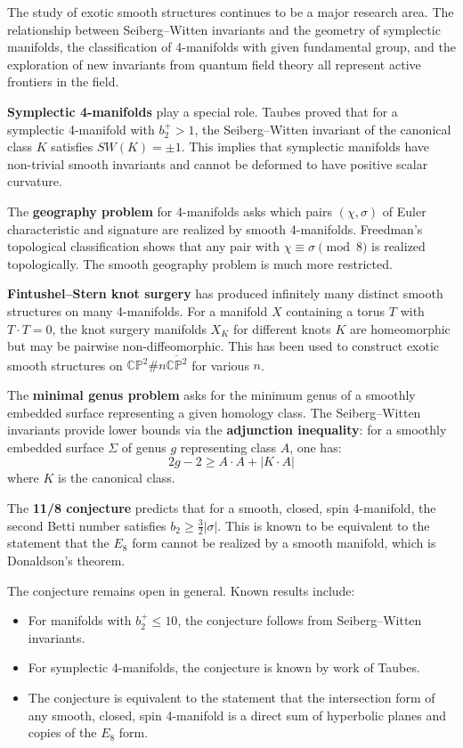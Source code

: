 The study of exotic smooth structures continues to be a major research area. The relationship between Seiberg--Witten invariants and the geometry of symplectic manifolds, the classification of 4-manifolds with given fundamental group, and the exploration of new invariants from quantum field theory all represent active frontiers in the field.

\textbf{Symplectic 4-manifolds} play a special role. Taubes proved that for a symplectic 4-manifold with $b_2^+ > 1$, the Seiberg--Witten invariant of the canonical class $K$ satisfies $SW(K) = \pm 1$. This implies that symplectic manifolds have non-trivial smooth invariants and cannot be deformed to have positive scalar curvature.

The \textbf{geography problem} for 4-manifolds asks which pairs $(\chi, \sigma)$ of Euler characteristic and signature are realized by smooth 4-manifolds. Freedman's topological classification shows that any pair with $\chi \equiv \sigma \pmod{8}$ is realized topologically. The smooth geography problem is much more restricted.

\textbf{Fintushel--Stern knot surgery} has produced infinitely many distinct smooth structures on many 4-manifolds. For a manifold $X$ containing a torus $T$ with $T \cdot T = 0$, the knot surgery manifolds $X_K$ for different knots $K$ are homeomorphic but may be pairwise non-diffeomorphic. This has been used to construct exotic smooth structures on $\mathbb{CP}^2 \# n\overline{\mathbb{CP}^2}$ for various $n$.

The \textbf{minimal genus problem} asks for the minimum genus of a smoothly embedded surface representing a given homology class. The Seiberg--Witten invariants provide lower bounds via the \textbf{adjunction inequality}: for a smoothly embedded surface $\Sigma$ of genus $g$ representing class $A$, one has:
\[
2g - 2 \geq A \cdot A + |K \cdot A|
\]
where $K$ is the canonical class.

The \textbf{11/8 conjecture} predicts that for a smooth, closed, spin 4-manifold, the second Betti number satisfies $b_2 \geq \frac{3}{2}|\sigma|$. This is known to be equivalent to the statement that the $E_8$ form cannot be realized by a smooth manifold, which is Donaldson's theorem.

The conjecture remains open in general. Known results include:
\begin{itemize}
    \item For manifolds with $b_2^+ \leq 10$, the conjecture follows from Seiberg--Witten invariants.
    \item For symplectic 4-manifolds, the conjecture is known by work of Taubes.
    \item The conjecture is equivalent to the statement that the intersection form of any smooth, closed, spin 4-manifold is a direct sum of hyperbolic planes and copies of the $E_8$ form.
\end{itemize}


